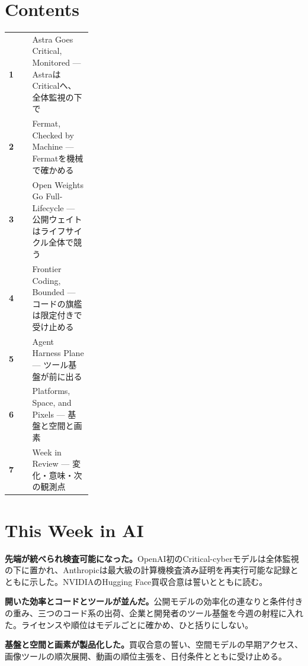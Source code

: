 \section*{Contents}
\begin{tabularx}{0.98\linewidth}{@{}>{\bfseries}p{0.28\linewidth}X@{}}
  1 & Astra Goes Critical, Monitored --- AstraはCriticalへ、全体監視の下で \\
  2 & Fermat, Checked by Machine --- Fermatを機械で確かめる \\
  3 & Open Weights Go Full-Lifecycle --- 公開ウェイトはライフサイクル全体で競う \\
  4 & Frontier Coding, Bounded --- コードの旗艦は限定付きで受け止める \\
  5 & Agent Harness Plane --- ツール基盤が前に出る \\
  6 & Platforms, Space, and Pixels --- 基盤と空間と画素 \\
  7 & Week in Review --- 変化・意味・次の観測点 \\
\end{tabularx}

\vspace{4mm}
\section*{This Week in AI}

\begin{tcolorbox}[enhanced,colback=SurveySoft,colframe=SurveyRule,boxrule=0.4pt,arc=1mm,left=3mm,right=3mm,top=2mm,bottom=2mm]
\textbf{先端が統べられ検査可能になった。}\quad OpenAI初のCritical-cyberモデルは全体監視の下に置かれ、Anthropicは最大級の計算機検査済み証明を再実行可能な記録とともに示した。NVIDIAのHugging Face買収合意は誓いとともに読む。
\end{tcolorbox}

\begin{tcolorbox}[enhanced,colback=SurveySoft,colframe=SurveyRule,boxrule=0.4pt,arc=1mm,left=3mm,right=3mm,top=2mm,bottom=2mm]
\textbf{開いた効率とコードとツールが並んだ。}\quad 公開モデルの効率化の連なりと条件付きの重み、三つのコード系の出荷、企業と開発者のツール基盤を今週の射程に入れた。ライセンスや順位はモデルごとに確かめ、ひと括りにしない。
\end{tcolorbox}

\begin{tcolorbox}[enhanced,colback=SurveySoft,colframe=SurveyRule,boxrule=0.4pt,arc=1mm,left=3mm,right=3mm,top=2mm,bottom=2mm]
\textbf{基盤と空間と画素が製品化した。}\quad 買収合意の誓い、空間モデルの早期アクセス、画像ツールの順次展開、動画の順位主張を、日付条件とともに受け止める。
\end{tcolorbox}

